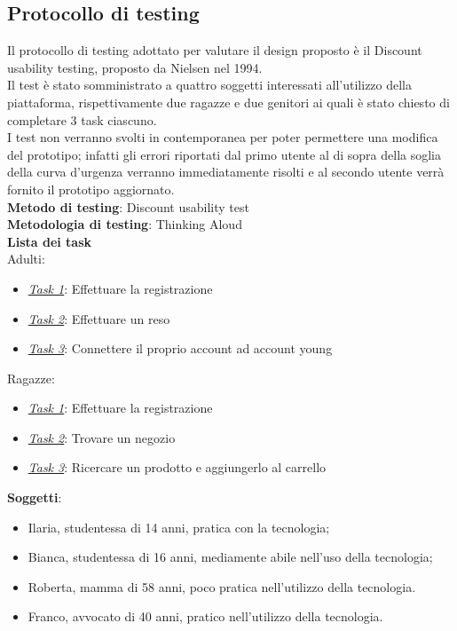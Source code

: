 \documentclass[12pt,a4paper]{report}
\begin{document}
\subsection{Protocollo di testing}
Il protocollo di testing adottato per valutare il design proposto è il Discount usability testing, proposto da Nielsen nel 1994.\\
Il test è stato somministrato a quattro soggetti interessati all'utilizzo della piattaforma, rispettivamente due ragazze e due genitori ai quali è stato chiesto di completare 3 task ciascuno.\\
I test non verranno svolti in contemporanea per poter permettere una modifica del prototipo; infatti gli errori riportati dal primo utente al di sopra della soglia della curva d'urgenza verranno immediatamente risolti e al secondo utente verrà fornito il prototipo aggiornato.\vspace{5mm}
\\\vspace{5mm}
\textbf{Metodo di testing}: Discount usability test
\\\vspace{5mm}
\textbf{Metodologia di testing}: Thinking Aloud
\\\vspace{5mm}
\textbf{Lista dei task}\\
Adulti:
  \begin{itemize}
    \item \underline{\textit{Task 1}}: Effettuare la registrazione
    \item \underline{\textit{Task 2}}: Effettuare un reso
    \item \underline{\textit{Task 3}}: Connettere il proprio account ad account young
  \end{itemize}
Ragazze:
    \begin{itemize}
      \item \underline{\textit{Task 1}}: Effettuare la registrazione
      \item \underline{\textit{Task 2}}: Trovare un negozio
      \item \underline{\textit{Task 3}}: Ricercare un prodotto e aggiungerlo al carrello
    \end{itemize}
  \textbf{Soggetti}:
  \begin{itemize}
    \item Ilaria, studentessa di 14 anni, pratica con la tecnologia;
    \item Bianca, studentessa di 16 anni, mediamente abile nell'uso della tecnologia;
    \item Roberta, mamma di 58 anni, poco pratica nell'utilizzo della tecnologia.
    \item Franco, avvocato di 40 anni, pratico nell'utilizzo della tecnologia.
  \end{itemize}
\end{document}
